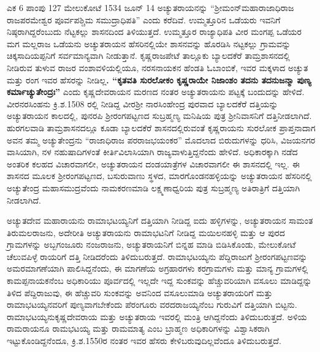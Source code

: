 {ಎಕ 6 ಪಾಂಪು 127 ಮೇಲುಕೋಟೆ 1534 ಜೂನ್​ 14} ಅಚ್ಯುತರಾಯನನ್ನು “ಶ‍್ರೀಮಂನ್​ ಮಹಾರಾಜಾಧಿರಾಜ ರಾಜಪರಮೇಶ್ವರ ಪೂರ್ವಪಶ್ಚಿಮ ಸಮುದ್ರಾಧಿಪತಿ” ಎಂದು ಕರೆದಿವೆ. ಉಮ್ಮತ್ತೂರಿನ ಒಡೆಯರು ಇವನಿಗೆ ನಿಷ್ಠರಾಗಿದ್ದರೆಂಬುದು ನೆಟ್ಟಕಲ್ಲು ಶಾಸನದಿಂದ ತಿಳಿಯುತ್ತದೆ. ಉಮ್ಮತ್ತೂರ ರಾಜ್ಯಾಧಿಪತಿ ವೀರ ಮಂಗಪ್ಪ ಒಡೆಯರ ಮಗ ಮಲ್ಲರಾಜ ಒಡೆಯನು ಅಚ್ಯುತರಾಯನ ಹೆಸರಿನಲ್ಲಿಯೇ ಶಾಸನವನ್ನು ಹೊರಡಿಸಿ ನಟ್ಟಕಲ್ಲು ಗ್ರಾಮವನ್ನು ಚಿಕ್ಕಸಾದಿಯಪ್ಪನಿಗೆ ಸರ್ವಮಾನ್ಯವಾಗಿ ನೀಡುತ್ತಾನೆ. ಕೃಷ್ಣರಾಜಪೇಟೆ ತಾಲ್ಲೂಕು ಬ್ಯಾಲದಕೆರೆ ತಾಮ್ರಶಾಸನದಲ್ಲಿ ನೀಡಿರುವ ತುಳುವ ರಾಜರ ವಂಶಾವಳಿಯಲ್ಲಿಯೂ, ನರಸನಾಯಕನ ಹೆಂಡತಿ ಓಬಾಂಬಿಕೆ, ಇವರ ಮಕ್ಕಳಾದ ಅಚ್ಯುತ ಮತ್ತು ರಂಗ ಇವರ ಹೆಸರನ್ನು ನೀಡಿಲ್ಲ\textbf{. “ಕೃತವತಿ ಸುರಲೋಕಂ ಕೃಷ್ಣರಾಯೇ ನಿಜಾಂಶಂ ತದನು ತದನುಜನ್ಮಾ ಪುಣ್ಯ ಕರ್ಮಾಚ್ಯುತೇಂದ್ರಃ”} ಎಂದು ಕೃಷ್ಣದೇವರಾಯನ ಮರಣದ ನಂತರ ಅಚ್ಯುತರಾಯನು ಪಟ್ಟಕ್ಕೆ ಬಂದುದನ್ನು ಹೇಳಿದೆ. ವೀರನರಸಿಂಹನು ಕ್ರಿ.ಶ.1508 ರಲ್ಲಿ ನೀಡಿದ್ದ ವೀರಶ‍್ರೀ ನಾರಸಿಂಹೇಂದ್ರ ಪುರವಾದ ಬ್ಯಾಲದಕೆರೆ ದತ್ತಿಯನ್ನು ಅಚ್ಯುತರಾಯನ ಕಾಲದಲ್ಲಿ, ಪುನರಪಿ ಶ‍್ರೀರಂಗಪಟ್ಟಣದ ಸುಬ್ರಹ್ಮಣ್ಯ ಮನಿಷಿಯ ಪುತ್ರ ಶ‍್ರೀನಿವಾಸನಿಗೆ ದತ್ತಿನೀಡಲಾಗಿದೆ. ಹುರಗಲವಾಡಿ ತಾಮ್ರಶಾಸನದಲ್ಲೂ ಕೂಡಾ ಬ್ಯಾಲದಕೆರೆ ಶಾಸನದಲ್ಲಿರುವಂತೆ ಕೃಷ್ಣರಾಯನು ಸುರಲೋಕ ಪ್ರಾಪ್ತನಾದಾಗ ಅವನ ತಮ್ಮ ಅಚ್ಯುತೇಂದ್ರನು “ರಾಜಾಧಿರಾಜ ಪರರಾಜಭಯಂಕರ” ಮೊದಲಾದ ಬಿರುದುಗಳನ್ನು ಧರಿಸಿ, ವಿಜಯನಗರ ವಾಸಿಯಾಗಿ, ನಳ ನಹುಷಾದಿಗಳಂತೆ ಕೀರ್ತಿವಿಲಾಸಿಯಾಗಿ ರಾಜ್ಯವಾಳುತ್ತಿದ್ದನೆಂದು ಹೇಳಿದೆ. ಅಧಿಕಾರಕ್ಕಾಗಿ ನಡೆದ ಅಂತರಿಕ ಕಲಹದ ವಿಚಾರವಾಗಲೀ, ಅಚ್ಯುತರಾಯನ ದಂಡಯಾತ್ರೆಗಳ ವಿಚಾರವಾಗಲೀ ಈ ಶಾಸನದಲ್ಲಿ ಇಲ್ಲ. ಈ ಶಾಸನದ ಮೂಲಕ ಶ‍್ರೀರಂಗಪಟ್ಟಣದ, ಬಸುರುವಾಣು ಸ್ಥಳದ, ಮಾರಗೊಂಡನಹಳ್ಳಿಯನ್ನು ಅಚ್ಯುತರಾಯನ ಹೆಸರಿನಲ್ಲಿ ಅಚ್ಯುತೇಂದ್ರ ಮಹಾಸಮುದ್ರವೆಂದು ನಾಮಕರಣಮಾಡಿ ಲಕ್ಷ್ಮಣಾಧ್ವರಿಯ ಪುತ್ರ ಸುಬ್ರಹ್ಮಣ್ಯ ಅತಿರಾತ್ರಿಗೆ ದತ್ತಿಯಾಗಿ ನೀಡಲಾಗಿದೆ.

ಅಚ್ಯುತದೇವ ಮಹಾರಾಯನು ರಾಮಾಭಟಯ್ಯನಿಗೆ ದತ್ತಿಯಾಗಿ ನೀಡಿದ್ದ ಐದು ಹಳ್ಳಿಗಳನ್ನು, ಅಚ್ಯುತರಾಯನ ಸಾಮಂತ ತಿರುಮಲರಾಜನು, ಅದೇರೀತಿ ಅಚ್ಯುತರಾಯನು ರಾಮಾಭಟನಿಗೆ ನೀಡಿದ್ದ ಮಯಿಲನಹಳ್ಳಿ ಮತ್ತು ಆ ಪುರದ ಗ್ರಾಮಗಳನ್ನು ಅಬ್ಬಗಂಜೂರು ನಂಜರಾಜನು, ಅಚ್ಯುತರಾಯನಿಗೆ ಬಿನ್ನಹ ಮಾಡಿ ಬಿಡಿಸಿಕೊಂಡು, ಮೇಲುಕೋಟೆ ಚೆಲುವಪಿಳ್ಳೆ ರಾಯರಿಗೆ ದತ್ತಿ ನೀಡಿದರೆಂದು ತಿಳಿದುಬರುತ್ತದೆ. ರಾಮಾಭಟಯ್ಯನು ಪೆದ್ದಿರಾಜುಗೆ ಶ‍್ರೀರಂಗಪಟ್ಟಣವನ್ನು ಅಮರಮಾಗಣೆಯಾಗಿ ಪಾಲಿಸಿದ್ದನೆಂದು, ಈ ಮಾಗಣೆಯ ಅಗ್ರಹಾರಗಳು ಕರಗ್ರಾಮಗಳು ಮತ್ತು ಮಾನ್ಯ ಗ್ರಾಮಗಳಲ್ಲಿ ಕಾಮಪ್ಪನಾಯಕನೆಂಬ ಅಧಿಕಾರಿಯು ಪೂರ್ವದಲ್ಲಿ ಇಲ್ಲದೇ ಇದ್ದ ಸುಂಕವನ್ನು ಹೆಚ್ಚುವರಿಯಾಗಿ ವಸೂಲು ಮಾಡಿದ್ದನ್ನು ತಿಳಿದ ಪೆದ್ದಿರಾಜುವು, ಈ ಹೆಚ್ಚುವರಿ ಸುಂಕವನ್ನು ಅವನಿಂದ ವಸೂಲುಮಾಡಿ ಅಚ್ಯುತರಾಯರಿಗೆ ಮತ್ತು ರಾಮಾಭಟಯ್ಯನವರಿಗೆ ಪುಣ್ಯವಾಗಬೇಕೆಂದು ಪೆರಂಗೂರು ವರದರಾಜಯ್ಯನೆಂಬ ಗುರುವಿಗೆ ದತ್ತಿಯಾಗಿ ಬಿಟ್ಟನು. ರಾಮಾಭಟಯ್ಯನು\break ಕೃಷ್ಣದೇವರಾಯ ಮತ್ತು ಅಚ್ಯುತರಾಯ ಇವರಲ್ಲಿ ಮಂತ್ರಿ ಆಗಿದ್ದನೆಂದು ತಿಳಿದುಬರುತ್ತದೆ. ಅಳಿಯ ರಾಮರಾಯನೂ ರಾಮಭಟಯ್ಯ ಮತ್ತು ರಾಮಮಾತ್ಯ ಎಂಬ ಬ್ರಾಹ್ಮಣ ಅಧಿಕಾರಿಗಳನ್ನು ವಿಶ್ವಾಸಿಕರಾಗಿ ಇಟ್ಟುಕೊಂಡಿದ್ದನೆಂದೂ, ಕ್ರಿ.ಶ.1550ರ ನಂತರ ಇವರ ಹೆಸರು ಕೇಳಿಬರುವುದಿಲ್ಲವೆಂದೂ ತಿಳಿದುಬರುತ್ತದೆ.

